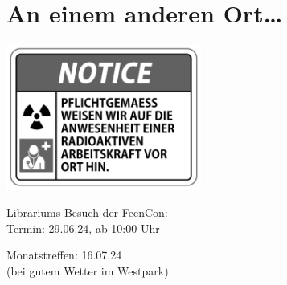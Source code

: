 \documentclass[final]{multiversum}
\begin{document}
\vfill

\section{An einem anderen Ort\ldots}

\includegraphics[width=0.48\textwidth]{src/img/RADIOAKTIVE_ARBEITSKRAFT_greyscale.png}

\vfill

\begin{termine}
\item Librariums-Besuch der FeenCon:\\Termin: 29.06.24, ab 10:00 Uhr
\item Monatstreffen: 16.07.24\\(bei gutem Wetter im Westpark)
\end{termine}
\impressum
\end{document}
